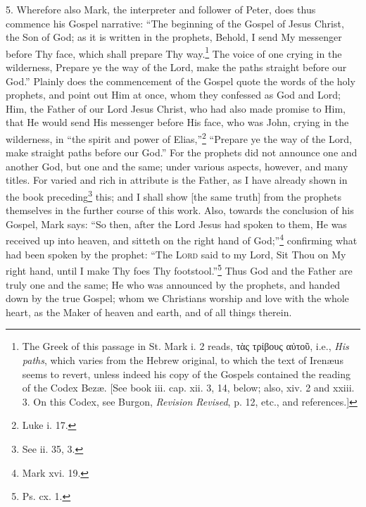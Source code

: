 5. Wherefore also Mark, the interpreter and follower of Peter, does thus commence his Gospel narrative: “The beginning of the Gospel of Jesus Christ, the Son of God; as it is written in the prophets, Behold, I send My messenger before Thy face, which shall prepare Thy way.\footnote{The Greek of this passage in St. Mark i. 2 reads, \textgreek{τὰς τρίβους αὐτοῦ}, i.e., \emph{His paths}, which varies from the Hebrew original, to which the text of Irenæus seems to revert, unless indeed his copy of the Gospels contained the reading of the Codex Bezæ. [See book iii. cap. xii. 3, 14, below; also, xiv. 2 and xxiii. 3. On this Codex, see Burgon, \emph{Revision Revised}, p. 12, etc., and references.]} The voice of one crying in the wilderness, Prepare ye the way of the Lord, make the paths  straight before our God.” Plainly does the commencement of the Gospel quote the words of the holy prophets, and point out Him at once, whom they confessed as God and Lord; Him, the Father of our Lord Jesus Christ, who had also made promise to Him, that He would send His messenger before His face, who was John, crying in the wilderness, in “the spirit and power of Elias,”\footnote{Luke i. 17.} “Prepare ye the way of the Lord, make straight paths before our God.” For the prophets did not announce one and another God, but one and the same; under various aspects, however, and many titles. For varied and rich in attribute is the Father, as I have already shown in the book preceding\footnote{See ii. 35, 3.} this; and I shall show [the same truth] from the prophets themselves in the further course of this work. Also, towards the conclusion of his Gospel, Mark says: “So then, after the Lord Jesus had spoken to them, He was received up into heaven, and sitteth on the right hand of God;”\footnote{Mark xvi. 19.} confirming what had been spoken by the prophet: “The \textsc{Lord} said to my Lord, Sit Thou on My right hand, until I make Thy foes Thy footstool.”\footnote{Ps. cx. 1.} Thus God and the Father are truly one and the same; He who was announced by the prophets, and handed down by the true Gospel; whom we Christians worship and love with the whole heart, as the Maker of heaven and earth, and of all things therein.


